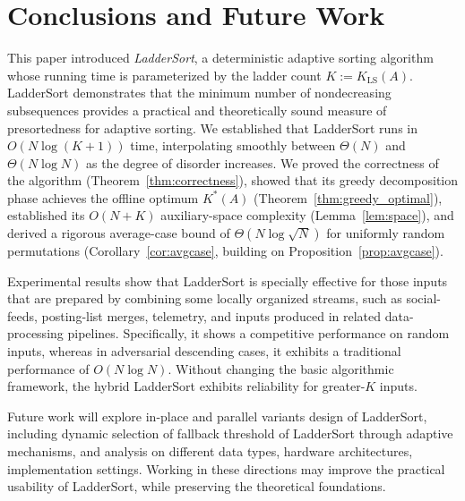 \documentclass{ieeeaccess}
\theoremstyle{plain}
\theoremstyle{definition}
\begin{document}
\section{Conclusions and Future Work}
\label{sec:conclusion}

This paper introduced \emph{LadderSort}, a deterministic adaptive sorting algorithm whose running time is parameterized by the ladder count $K := K_{\mathrm{LS}}(A)$. LadderSort demonstrates that the minimum number of nondecreasing subsequences provides a practical and theoretically sound measure of presortedness for adaptive sorting. We established that LadderSort runs in $O(N\log(K+1))$ time, interpolating smoothly between $\Theta(N)$ and $\Theta(N\log N)$ as the degree of disorder increases. We proved the correctness of the algorithm (Theorem~\ref{thm:correctness}), showed that its greedy decomposition phase achieves the offline optimum $K^*(A)$ (Theorem~\ref{thm:greedy_optimal}), established its $O(N+K)$ auxiliary-space complexity (Lemma~\ref{lem:space}), and derived a rigorous average-case bound of $\Theta(N\log\sqrt{N})$ for uniformly random permutations (Corollary~\ref{cor:avgcase}, building on Proposition~\ref{prop:avgcase}).

Experimental results show that LadderSort is specially effective for those inputs that are prepared by combining some locally organized streams, such as social-feeds, posting-list merges, telemetry, and inputs produced in related data-processing pipelines. Specifically, it shows a competitive performance on random inputs, whereas in adversarial descending cases, it exhibits a traditional performance of $O(N\log N)$. 
Without changing the basic algorithmic framework, the hybrid LadderSort exhibits reliability for greater-$K$ inputs.     

Future work will explore in-place and parallel variants design of LadderSort, including dynamic selection of fallback threshold of LadderSort through adaptive mechanisms, and analysis on different data types, hardware architectures, implementation settings. Working in these directions may improve the practical usability of LadderSort, while preserving the theoretical foundations.




\EOD
\end{document}
